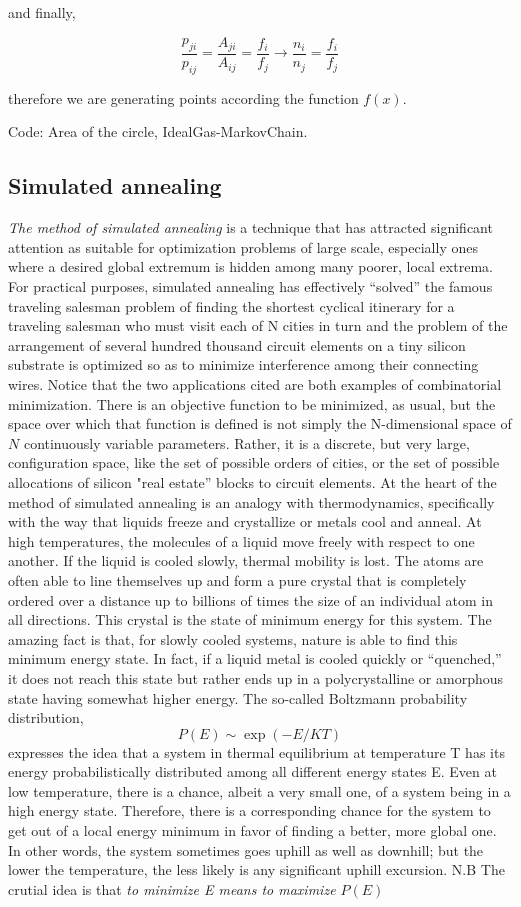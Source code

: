 and finally,

\[ \frac{p_{ji}}{p_{ij}} = \frac{A_{ji}}{A_{ij}} = \frac{f_i}{f_j} \to \frac{n_i}{n_j} = \frac{f_i}{f_j} \]

therefore we are generating points according the function $f(x)$.

Code: Area of the circle, IdealGas-MarkovChain.  

\subsection{Simulated annealing}
\textit{The method of simulated annealing} is a technique that has attracted significant attention as suitable for optimization problems of large scale, especially ones where a desired global extremum is hidden among many poorer, local extrema. For practical purposes, simulated annealing has effectively “solved” the famous traveling salesman problem of finding the shortest cyclical itinerary for a traveling salesman who must visit each of N cities in turn and the problem of the arrangement of several hundred thousand circuit elements on a tiny silicon substrate is optimized so as to minimize interference among their connecting wires.
Notice that the two applications cited are both examples of combinatorial minimization. There is an objective function to be minimized, as usual, but the space over which that function is defined is not simply the N-dimensional space of $N$ continuously variable parameters. Rather, it is a discrete, but very large, configuration space, like the set of possible orders of cities, or the set of possible allocations of silicon "real estate” blocks to circuit elements.
At the heart of the method of simulated annealing is an analogy with thermodynamics, specifically with the way that liquids freeze and crystallize or metals cool and anneal. At high temperatures, the molecules of a liquid move freely with respect to one another. If the liquid is cooled slowly, thermal mobility is lost. The atoms are often able to line themselves up and form a pure crystal that is completely ordered over a distance up to billions of times the size of an individual atom in all directions. This crystal is the state of minimum energy for this system. The amazing fact is that, for slowly cooled systems, nature is able to find this minimum energy state. In fact, if a liquid metal is cooled quickly or “quenched,” it does not reach this state but rather ends up in a polycrystalline or amorphous state having somewhat higher energy.
 The so-called Boltzmann probability distribution,
 \[ P(E) \sim \exp(-E/KT) \]
expresses the idea that a system in thermal equilibrium at temperature T has its energy probabilistically distributed among all different energy states E. Even at low temperature, there is a chance, albeit a very small one, of a system being in a high energy state. Therefore, there is a corresponding chance for the system to get out of a local energy minimum in favor of finding a better, more global one. In other words, the system sometimes goes uphill as well as downhill; but the lower the temperature, the less likely is any significant uphill excursion.
N.B The crutial idea is that \textit{to minimize E means to maximize $P(E)$}

